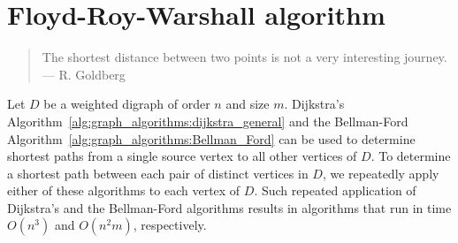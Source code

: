 


\section{Floyd-Roy-Warshall algorithm}
\label{sec:graph_algorithms:Floyd_Roy_Warshall_algorithm}

\begin{quote}
\footnotesize
The shortest distance between two points is not a very interesting
journey. \\
\noindent
--- R. Goldberg
\end{quote}

\noindent
Let $D$ be a weighted digraph of order $n$ and size $m$.
Dijkstra's
Algorithm~\ref{alg:graph_algorithms:dijkstra_general} and the
Bellman-Ford
Algorithm~\ref{alg:graph_algorithms:Bellman_Ford} can be used to
determine shortest paths from a single source
vertex to all other vertices of $D$. To determine a shortest path
between each pair of distinct vertices in $D$, we repeatedly apply
either of these algorithms to each vertex of $D$. Such repeated
application of Dijkstra's and the Bellman-Ford algorithms results in
algorithms that run in time $O(n^3)$ and $O(n^2m)$, respectively.


